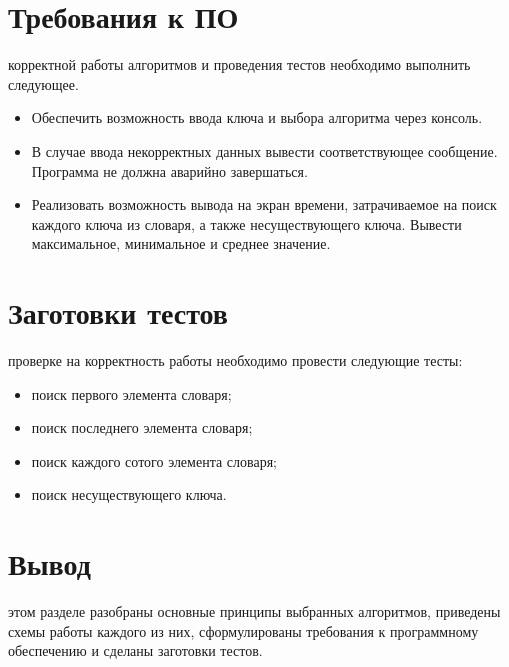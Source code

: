 \section{Требования к ПО}
 корректной работы алгоритмов и проведения тестов необходимо выполнить следующее.
\begin{itemize}
	\item Обеспечить возможность ввода ключа и выбора алгоритма через консоль.
	\item В случае ввода некорректных данных вывести соответствующее сообщение. Программа не должна аварийно завершаться.
	\item Реализовать возможность вывода на экран времени, затрачиваемое на поиск каждого ключа из словаря, а также несуществующего ключа. Вывести максимальное, минимальное и среднее значение.
\end{itemize}

\section{Заготовки тестов}
 проверке на корректность работы необходимо провести следующие тесты:
\begin{itemize}
	\item поиск первого элемента словаря;
	\item поиск последнего элемента словаря;
	\item поиск каждого сотого элемента словаря;
	\item поиск несуществующего ключа.
\end{itemize}

\section*{Вывод}
 этом разделе разобраны основные принципы выбранных алгоритмов, приведены схемы работы каждого из них, сформулированы требования к программному обеспечению и сделаны заготовки тестов.
